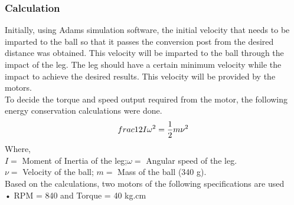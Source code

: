         \subsubsection{Calculation}
            Initially, using Adams simulation software, the initial velocity that needs to be imparted to the ball so that it passes the
            conversion post from the desired distance was obtained. This velocity will be imparted to the ball through the impact of
            the leg. The leg should have a certain minimum velocity while the impact to achieve the desired results. This velocity
            will be provided by the motors.                                                                                                         \\
            To decide the torque and speed output required from the motor, the following energy conservation calculations were
            done.                                                                                                                                   \\   
            $$\\frac{1}{2} I {\omega}^2  =  \frac{1}{2} m {\nu}^2$$     
            Where,                                                                                                                                  \\
            $I =$ Moment of Inertia of the leg;\tab $\omega =$ Angular speed of the leg.                                                            \\
            $\nu =$ Velocity of the ball;      \tab $m =$ Mass of the ball (340 g).                                                                 \\
            Based on the calculations, two motors of the following specifications are used                                                          \\
            •  RPM = 840 and Torque = 40 kg.cm                                                                                                      \\

